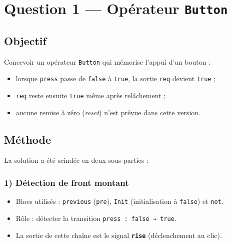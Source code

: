\documentclass[11pt,a4paper]{report}
\begin{document}
\newpage

\chapter{Question 1 — Opérateur \texttt{Button}}

\section*{Objectif}
Concevoir un opérateur \texttt{Button} qui mémorise l’appui d’un bouton :
\begin{itemize}
  \item lorsque \texttt{press} passe de \texttt{false} à \texttt{true}, la sortie \texttt{req} devient \texttt{true} ;
  \item \texttt{req} reste ensuite \texttt{true} même après relâchement ;
  \item aucune remise à zéro (\textit{reset}) n’est prévue dans cette version.
\end{itemize}

\section*{Méthode}
La solution a été scindée en deux sous-parties :

\subsection*{1) Détection de front montant}
\begin{itemize}
  \item Blocs utilisés : \texttt{previous} (\texttt{pre}), \texttt{Init} (initialisation à \texttt{false}) et \texttt{not}.
  \item Rôle : détecter la transition \texttt{press : false → true}.
  \item La sortie de cette chaîne est le signal \textbf{\texttt{rise}} (déclenchement au clic).
\end{itemize}
\end{document}
